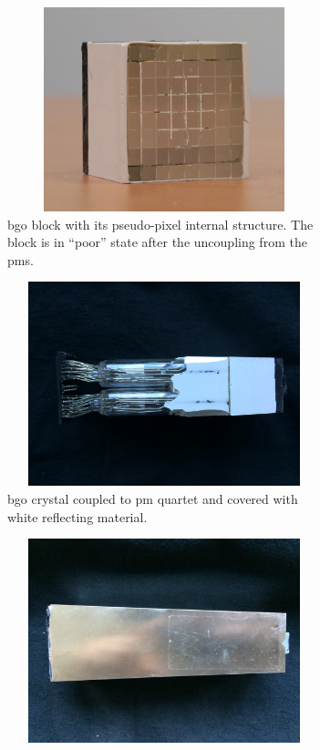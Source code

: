 \begin{figure}
\begin{subfigure}[t]{.5\textwidth}
\centering
\includegraphics[width=1\textwidth, height=16em]{03_GraphicFiles/chapter3_CLaRySproto/Absorber/images/block_noPM}
\caption{\gls{bgo} block with its pseudo-pixel internal structure. The block is in \enquote{poor} state after the uncoupling from the \glspl{pm}.}
\label{chap3::fig::block_noPM}
\end{subfigure}
\begin{subfigure}[t]{.5\textwidth}
\centering
\includegraphics[width=1\textwidth, height=16em]{03_GraphicFiles/chapter3_CLaRySproto/Absorber/images/originalBlock_noAluminum}
\caption{\gls{bgo} crystal coupled to \gls{pm} quartet and covered with white reflecting material.}
\label{chap3::fig::originalBlock_noAl}
\end{subfigure}\newline
\begin{subfigure}[t]{.5\textwidth}
\centering
\includegraphics[width=1\textwidth, height=16em]{03_GraphicFiles/chapter3_CLaRySproto/Absorber/images/originalBlock_withAluminum}

\end{subfigure}
\end{figure}

